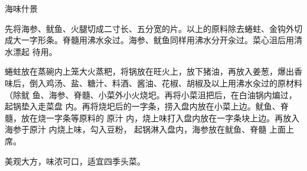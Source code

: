 \begin{recipe}{海味什景}

\ingredients


\preparation

\step 先将海参、鱿鱼、火腿切成二寸长、五分宽的片。以上的原料除去蜷蛀、金钩外切
成大一字形条。脊髓用沸水汆过。海参、鱿鱼同样用沸水分开汆过。菜心沮后用清水漂起
待用。

\step 蜷蛀放在蒸碗内上笼大火蒸粑，将锅放在旺火上，放下猪油，再放入姜葱，爆出香
味后，倒入鸡汤、盐、糖汁、料酒、酱油、花椒、胡椒及以上用沸水汆过的原材料（除鱿
鱼、海参、脊髓、小菜外小火烧圯。再将小菜沮把后，在白油锅内煸过，起锅垫入走菜盘
内。再将烧圯后的一字条，捞入盘内放在小菜上边。鱿鱼、脊髓，放在烧一字条等原料的
原汁 内，烧上味打入盘内放在一字条块上边。再放入海参于原汁 内烧上味，勾入豆粉，
起锅淋入盘内，海参放在鱿鱼、脊髓 上面上席。

\features

美观大方，味浓可口，适宜四季头菜。

\end{recipe}

